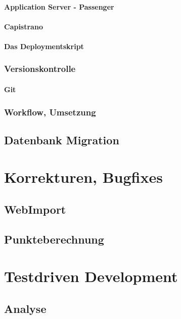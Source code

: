 \documentclass[12pt,             %
               a4paper,          %
               listof=totoc,     %
               index=totoc,      %
               bibliography=totoc,%
               oneside,         %
               BCOR1cm,          %
               english   %
               ]{scrbook}
\begin{document}
\subsubsection{Application Server - Passenger}
\subsubsection{Capistrano}
\subsubsection{Das Deploymentskript}

\subsection{Versionskontrolle}
\subsubsection{Git}

\subsection{Workflow, Umsetzung}

\section{Datenbank Migration}

\clearpage
\chapter{Korrekturen, Bugfixes}
\section{WebImport}

\section{Punkteberechnung}

\clearpage
\chapter{Testdriven Development}
\section{Analyse}
\end{document}
